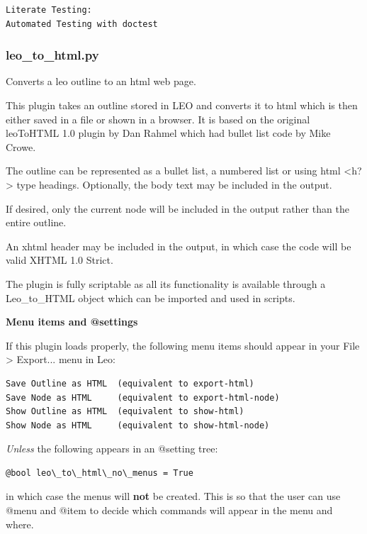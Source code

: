 \documentclass[a4paper,10pt,english]{sphinxmanual}
\begin{document}
\begin{Verbatim}[commandchars=\\\{\}]
Literate Testing:
Automated Testing with doctest
\end{Verbatim}


\subsubsection{leo\_to\_html.py}
\label{plugins:leo-to-html-py}
Converts a leo outline to an html web page.

This plugin takes an outline stored in LEO and converts it to html which is then
either saved in a file or shown in a browser. It is based on the original
leoToHTML 1.0 plugin by Dan Rahmel which had bullet list code by Mike Crowe.

The outline can be represented as a bullet list, a numbered list or using html
\textless{}h?\textgreater{} type headings. Optionally, the body text may be included in the output.

If desired, only the current node will be included in the output rather than
the entire outline.

An xhtml header may be included in the output, in which case the code will be
valid XHTML 1.0 Strict.

The plugin is fully scriptable as all its functionality is available through a
Leo\_to\_HTML object which can be imported and used in scripts.

\textbf{Menu items and @settings}

If this plugin loads properly, the following menu items should appear in
your File \textgreater{} Export... menu in Leo:

\begin{Verbatim}[commandchars=\\\{\}]
Save Outline as HTML  (equivalent to export-html)
Save Node as HTML     (equivalent to export-html-node)
Show Outline as HTML  (equivalent to show-html)
Show Node as HTML     (equivalent to show-html-node)
\end{Verbatim}

\emph{Unless} the following appears in an @setting tree:

\begin{Verbatim}[commandchars=\\\{\}]
@bool leo\_to\_html\_no\_menus = True
\end{Verbatim}

in which case the menus will \textbf{not} be created. This is so that the user can
use @menu and @item to decide which commands will appear in the menu and where.
\end{document}
